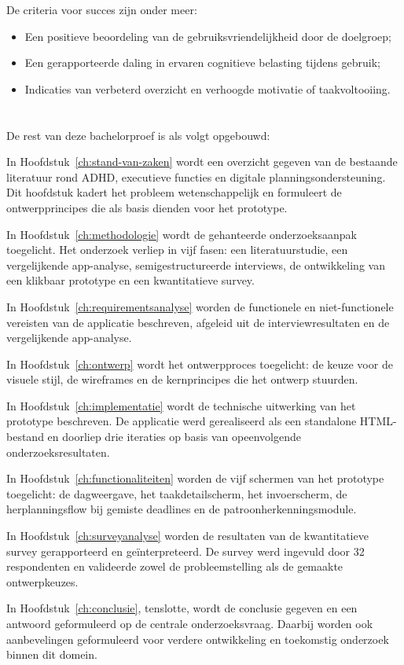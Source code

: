 De criteria voor succes zijn onder meer:
\begin{itemize}
  \item Een positieve beoordeling van de gebruiksvriendelijkheid door de doelgroep;
  \item Een gerapporteerde daling in ervaren cognitieve belasting tijdens gebruik;
  \item Indicaties van verbeterd overzicht en verhoogde motivatie of taakvoltooiing.
\end{itemize}
\section{}%
\label{sec:opzet-bachelorproef}


De rest van deze bachelorproef is als volgt opgebouwd:

In Hoofdstuk~\ref{ch:stand-van-zaken} wordt een overzicht gegeven van de
bestaande literatuur rond ADHD, executieve functies en digitale
planningsondersteuning. Dit hoofdstuk kadert het probleem wetenschappelijk
en formuleert de ontwerpprincipes die als basis dienden voor het prototype.

In Hoofdstuk~\ref{ch:methodologie} wordt de gehanteerde onderzoeksaanpak
toegelicht. Het onderzoek verliep in vijf fasen: een literatuurstudie,
een vergelijkende app-analyse, semigestructureerde interviews, de
ontwikkeling van een klikbaar prototype en een kwantitatieve survey.

In Hoofdstuk~\ref{ch:requirementsanalyse} worden de functionele en
niet-functionele vereisten van de applicatie beschreven, afgeleid uit de
interviewresultaten en de vergelijkende app-analyse.

In Hoofdstuk~\ref{ch:ontwerp} wordt het ontwerpproces toegelicht: de
keuze voor de visuele stijl, de wireframes en de kernprincipes die het
ontwerp stuurden.

In Hoofdstuk~\ref{ch:implementatie} wordt de technische uitwerking van
het prototype beschreven. De applicatie werd gerealiseerd als een
standalone HTML-bestand en doorliep drie iteraties op basis van
opeenvolgende onderzoeksresultaten.

In Hoofdstuk~\ref{ch:functionaliteiten} worden de vijf schermen van het
prototype toegelicht: de dagweergave, het taakdetailscherm, het
invoerscherm, de herplanningsflow bij gemiste deadlines en de
patroonherkenningsmodule.

In Hoofdstuk~\ref{ch:surveyanalyse} worden de resultaten van de kwantitatieve
survey gerapporteerd en geïnterpreteerd. De survey werd ingevuld door 32
respondenten en valideerde zowel de probleemstelling als de gemaakte
ontwerpkeuzes.

In Hoofdstuk~\ref{ch:conclusie}, tenslotte, wordt de conclusie gegeven
en een antwoord geformuleerd op de centrale onderzoeksvraag. Daarbij
worden ook aanbevelingen geformuleerd voor verdere ontwikkeling en
toekomstig onderzoek binnen dit domein.